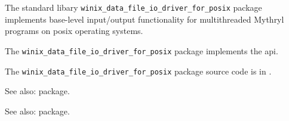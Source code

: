 
The standard libary {\tt winix\_data\_file\_io\_driver\_for\_posix} package implements base-level input/output functionality for multithreaded Mythryl programs on posix operating systems.

The {\tt winix\_data\_file\_io\_driver\_for\_posix} package implements the  api.

The {\tt winix\_data\_file\_io\_driver\_for\_posix} package source code is in .

See also:  package.

See also:  package.


